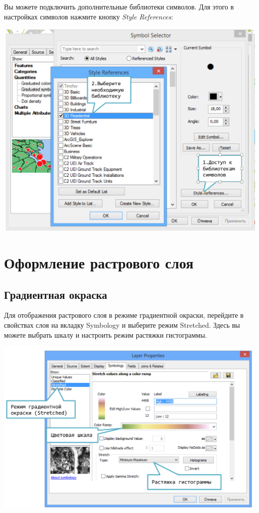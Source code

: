 \documentclass[12pt,]{book}
\begin{document}
Вы можете подключить дополнительные библиотеки символов. Для этого в настройках символов нажмите кнопку \emph{Style References}:

\includegraphics{images/Appendix/image36.png}

\hypertarget{manual-raster}{%
\chapter{Оформление растрового слоя}\label{manual-raster}}

\hypertarget{section-21}{%
\section{Градиентная окраска}\label{section-21}}

Для отображения растрового слоя в режиме градиентной окраски, перейдите в свойствах слоя на вкладку Symbology и выберите режим Stretched. Здесь вы можете выбрать шкалу и настроить режим растяжки гистограммы.

\includegraphics{images/Appendix/image37.png}
\end{document}
